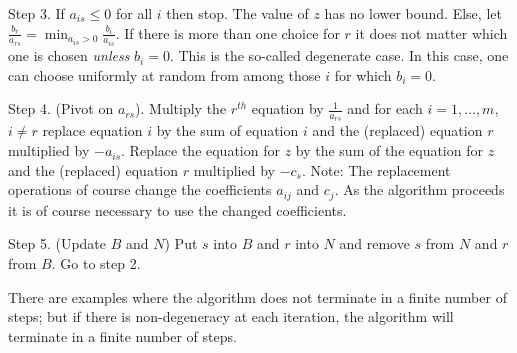 \documentclass[12pt]{article}
\begin{document}
Step 3. If $a_{is} \leq 0$ for all $i$ then stop. The value of $z$ 
has no lower bound.
Else, let $\frac{b_r}{a_{rs}} = \operatorname{min}_{a_{is}>0} \frac{b_i}{a_{is}}$.
If there is more than one choice for $r$ it does not matter which one
is chosen \emph{unless} $b_i = 0$. This is the so-called degenerate case.
In this case, one can choose uniformly at random from among those
$i$ for which $b_i = 0$.

Step 4. (Pivot on $a_{rs}$). Multiply the $r^{th}$ equation by $\frac{1}{a_{rs}}$ and for each $i=1, \ldots, m$, $i \ne r$
replace equation $i$ by the sum of equation $i$ and the (replaced) equation
$r$ multiplied by $-a_{is}$. Replace the equation for $z$ by
the  sum of the equation for $z$ and the (replaced) equation 
$r$ multiplied by $-c_s$. Note: The replacement operations of course
change the coefficients $a_{ij}$ and $c_j$. As the algorithm proceeds
it is of course necessary to use the changed coefficients. 

Step 5. (Update $B$ and $N$) Put $s$ into $B$ and $r$ into $N$
and remove $s$ from $N$ and $r$ from $B$. Go to step 2.

There are examples where the algorithm does not terminate in a finite
number of steps; but if there is non-degeneracy at each iteration,
the algorithm will terminate in a finite number of steps.
\end{document}
